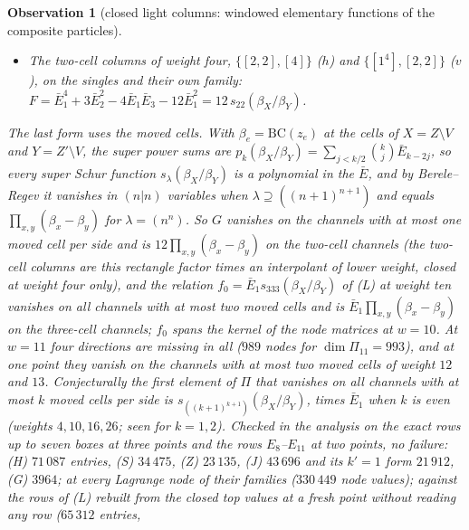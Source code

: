 \documentclass[11pt]{article}
\newtheorem{observation}{Observation}
\newcommand{\cbin}[2]{\genfrac{[}{]}{0pt}{}{#1}{#2}}
\begin{document}
\begin{observation}[closed light columns: windowed elementary functions of the composite particles]
\begin{itemize}
and the family of the same orientation, the unique element of $\mathrm{span}\{\mathrm{Alt}\,e_i\,\mathrm{Alt}\,e_j\}$
that restricts to $\bar E_1^2\cbin{R/2}{\mu}^{BC}$ on the one-cell pairs.  For $k'=1$ explicitly, with
$\alpha^W_r=\mathrm{Alt}\,e^W_r$ and $(Q,T)=(q^4,q^2)$,
\[
F=\alpha^{[k+1]}_{k+1}\,\alpha^{\{k,k+1\}}_2+c_k\,\alpha^{[k+2]}_{k+2}\,\alpha_1,\qquad
c_k=-\frac{(1-Q)(1-T^{k+1})}{(1-T)(1-QT^k)},
\]
where $c_k$ is the coefficient of $e_{k+1}$ in Macdonald's $P_{(2,1^{k-1})}(Q,T)=e_ke_1+c_ke_{k+1}$.
\item[(G)] The two-cell columns of weight four, $\{[2,2],[4]\}$ ($h$) and $\{[1^4],[2,2]\}$ ($v$), on the singles and
their own family: $F=\bar E_1^4+3\bar E_2^2-4\bar E_1\bar E_3-12\bar E_1^2=12\,s_{22}(\beta_X/\beta_Y)$.
\end{itemize}
The last form uses the moved cells.  With $\beta_e=\mathrm{BC}(z_e)$ at the cells of $X=Z\setminus V$ and $Y=Z'\setminus
V$, the super power sums are $p_k(\beta_X/\beta_Y)=\sum_{j<k/2}\binom kj\bar E_{k-2j}$, so every super Schur function
$s_\lambda(\beta_X/\beta_Y)$ is a polynomial in the $\bar E$, and by Berele--Regev it vanishes in $(n|n)$ variables when
$\lambda\supseteq((n+1)^{n+1})$ and equals $\prod_{x,y}(\beta_x-\beta_y)$ for $\lambda=(n^n)$.  So $G$ vanishes on the
channels with at most one moved cell per side and is $12\prod_{x,y}(\beta_x-\beta_y)$ on the two-cell channels (the
two-cell columns are this rectangle factor times an interpolant of lower weight, closed at weight four only), and the
relation $f_0=\bar E_1s_{333}(\beta_X/\beta_Y)$ of (L) at weight ten vanishes on all channels with at most two moved
cells and is $\bar E_1\prod_{x,y}(\beta_x-\beta_y)$ on the three-cell channels; $f_0$ spans the kernel of the node
matrices at $w=10$.  At $w=11$ four directions are missing in all ($989$ nodes for $\dim\Pi_{11}=993$), and at one point
they vanish on the channels with at most two moved cells of weight $12$ and $13$.  Conjecturally the first element of
$\Pi$ that vanishes on all channels with at most $k$ moved cells per side is $s_{((k+1)^{k+1})}(\beta_X/\beta_Y)$, times
$\bar E_1$ when $k$ is even (weights $4,10,16,26$; seen for $k=1,2$).  Checked in the analysis on the exact rows up to seven boxes at three points
and the rows $E_8$--$E_{11}$ at two points, no failure: (H) $71\,087$ entries, (S) $34\,475$, (Z) $23\,135$, (J)
$43\,696$ and its $k'=1$ form $21\,912$, (G) $3964$; at every Lagrange node of their families ($330\,449$ node values);
against the rows of (L) rebuilt from the closed top values at a fresh point without reading any row ($65\,312$ entries,

\end{observation}
\end{document}
